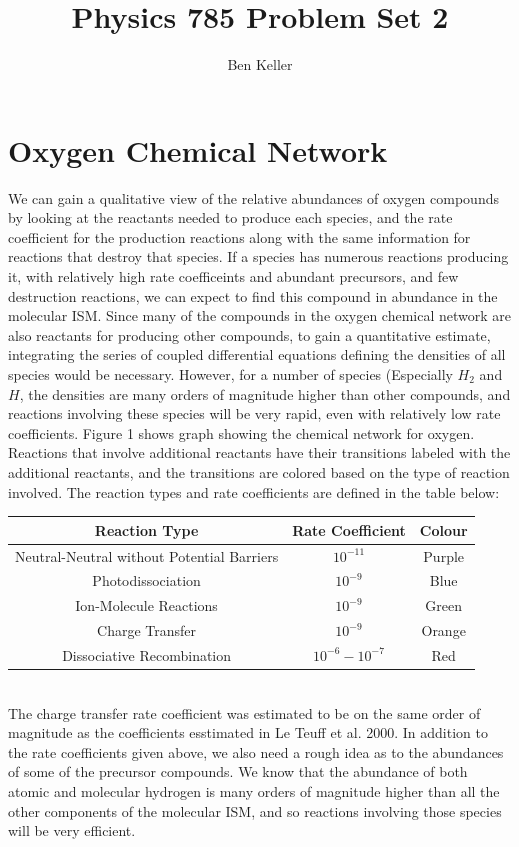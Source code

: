 \documentclass{article}
\author{Ben Keller}
\title{Physics 785 Problem Set 2}
\begin{document}
\maketitle
\section{Oxygen Chemical Network}
We can gain a qualitative view of the relative abundances of oxygen compounds
by looking at the reactants needed to produce each species, and the rate
coefficient for the production reactions along with the same information for
reactions that destroy that species.  If a species has numerous reactions
producing it, with relatively high rate coefficeints and abundant precursors,
and few destruction reactions, we can expect to find this compound in abundance
in the molecular ISM. Since many of the compounds in the oxygen chemical network 
are also reactants for producing other compounds, to gain a quantitative estimate, 
integrating the series of coupled differential equations defining the densities
of all species would be necessary.  However, for a number of species (Especially
$H_2$ and $H$, the densities are many orders of magnitude higher than other
compounds, and reactions involving these species will be very rapid, even with
relatively low rate coefficients.  Figure 1 shows graph showing the chemical network
for oxygen.  Reactions that involve additional reactants have their transitions
labeled with the additional reactants, and the transitions are colored based on
the type of reaction involved.  The reaction types and rate coefficients are
defined in the table below:\\

\begin{tabular}{| c | c | c |}
	\hline
	Reaction Type & Rate Coefficient & Colour \\
	\hline
	Neutral-Neutral without Potential Barriers & $10^{-11}$ & Purple\\
	Photodissociation & $10^{-9}$ & Blue\\
	Ion-Molecule Reactions & $10^{-9}$ & Green\\
	Charge Transfer & $10^{-9}$ & Orange\\
	Dissociative Recombination & $10^{-6}-10^{-7}$ & Red\\
	\hline
\end{tabular}\\

The charge transfer rate coefficient was estimated to be on the same order of
magnitude as the coefficients esstimated in Le Teuff et al. 2000.  In addition
to the rate coefficients given above, we also need a rough idea as to the
abundances of some of the precursor compounds.  We know that the abundance of
both atomic and molecular hydrogen is many orders of magnitude higher than all
the other components of the molecular ISM, and so reactions involving those
species will be very efficient.  
\end{document}
